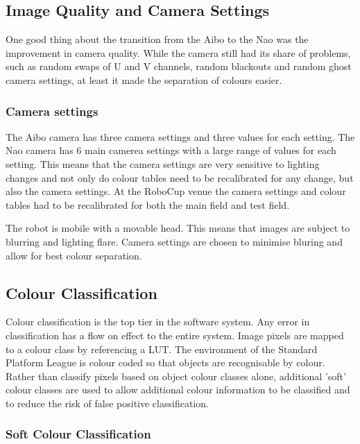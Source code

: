 

\subsection{Image Quality and Camera Settings}
One good thing about the transition from the Aibo to the Nao was the improvement in camera quality. While the camera still had its share of problems, such as random swaps of U and V channels, random blackouts and random ghost camera settings, at least it made the separation of colours easier.

\subsubsection{Camera settings}

The Aibo camera has three camera settings and three values for each setting. The Nao camera has 6 main camerea settings with a large range of values for each setting. This means that the camera settings are very sensitive to lighting changes and not only do colour tables need to be recalibrated for any change, but also the camera settings. At the RoboCup venue the camera settings and colour tables had to be recalibrated for both the main field and test field. 

The robot is mobile with a movable head. This means that images are subject to blurring and lighting flare. Camera settings are chosen to minimise bluring and allow for best colour separation.

\subsection{Colour Classification}

Colour classification is the top tier in the software system. Any error in classification has a flow on effect to the entire system. Image pixels are mapped to a colour class by referencing a LUT. The environment of the Standard Platform League is colour coded so that objects are recognisable by colour. Rather than classify pixels based on object colour classes alone, additional 'soft' colour classes are used to allow additional colour information to be classified and to reduce the risk of false positive classification.

\subsubsection{Soft Colour Classification}

